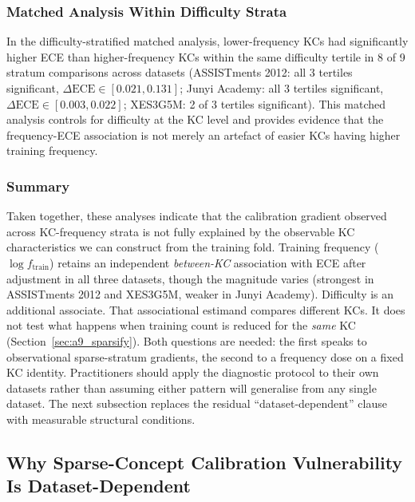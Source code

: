 \subsubsection*{Matched Analysis Within Difficulty Strata}
In the difficulty-stratified matched analysis, lower-frequency KCs had significantly higher ECE than higher-frequency KCs within the same difficulty tertile in 8 of 9 stratum comparisons across datasets (ASSISTments 2012: all 3 tertiles significant, $\Delta\text{ECE} \in [0.021, 0.131]$; Junyi Academy: all 3 tertiles significant, $\Delta\text{ECE} \in [0.003, 0.022]$; XES3G5M: 2 of 3 tertiles significant). This matched analysis controls for difficulty at the KC level and provides evidence that the frequency-ECE association is not merely an artefact of easier KCs having higher training frequency.

\subsubsection*{Summary}
Taken together, these analyses indicate that the calibration gradient observed across KC-frequency strata is not fully explained by the observable KC characteristics we can construct from the training fold. Training frequency ($\log f_{\text{train}}$) retains an independent \emph{between-KC} association with ECE after adjustment in all three datasets, though the magnitude varies (strongest in ASSISTments 2012 and XES3G5M, weaker in Junyi Academy). Difficulty is an additional associate. That associational estimand compares different KCs. It does not test what happens when training count is reduced for the \emph{same} KC (Section~\ref{sec:a9_sparsify}). Both questions are needed: the first speaks to observational sparse-stratum gradients, the second to a frequency dose on a fixed KC identity. Practitioners should apply the diagnostic protocol to their own datasets rather than assuming either pattern will generalise from any single dataset. The next subsection replaces the residual ``dataset-dependent'' clause with measurable structural conditions.

\subsection{Why Sparse-Concept Calibration Vulnerability Is Dataset-Dependent}
\label{sec:a5_dataset_dependent}

